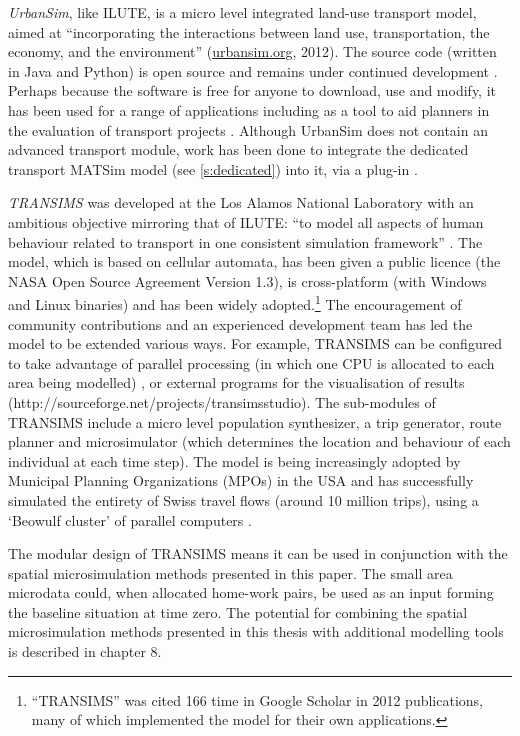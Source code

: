 \documentclass[a4paper, 11pt, twoside]{Thesis}
\begin{document}
\emph{UrbanSim}, like ILUTE, is a micro level integrated land-use transport
model, aimed at 
``incorporating the interactions between land use, transportation, the economy,
and the environment'' (\href{http://www.urbansim.org/Main/WebHome}{urbansim.org}, 2012).
The source code (written in Java and Python)
is open source and remains under continued development \citep{Nicolai2012-matsim}.
Perhaps because the software is free for anyone to download, use and modify,
it has been used for a range of applications including as a tool
to aid planners in the evaluation of transport projects \citep{Borning2008}.
Although UrbanSim does not contain an advanced transport module,
work has been done to integrate the dedicated transport MATSim model (see
\cref{s:dedicated}) into it,
via a plug-in \citep{Nicolai2012-matsim}.

\emph{TRANSIMS}  was developed at the Los Alamos National
Laboratory with an
ambitious objective mirroring that of ILUTE:
``to model all aspects of human behaviour related to
transport in one consistent simulation framework''
\citep[p.~1]{nagel1999transims}.  The model, which is based on cellular
automata, has been given a public licence (the NASA Open Source Agreement
Version 1.3), is cross-platform (with Windows and Linux binaries) and has been
widely adopted.\footnote{``TRANSIMS''
was cited 166 time in Google
Scholar in 2012 publications, many of which implemented the model for their own
applications.}
The encouragement of community contributions and an experienced development team
has led the model to be extended various ways. For example, TRANSIMS can be
configured to take advantage of parallel processing (in which one CPU is
allocated to each area being modelled) \citep{nagel2001parallel}, or external
programs for the visualisation of results
(http://sourceforge.net/projects/transimsstudio). The sub-modules of TRANSIMS
include a micro level population synthesizer, a trip generator, route planner
and microsimulator (which determines the location and behaviour of each
individual at each time step). The model is being increasingly adopted by
Municipal Planning Organizations (MPOs) in the USA \citep{lawe2009transims,
ullah2011travel} and has successfully simulated the entirety of Swiss travel
flows (around 10 million trips), using a `Beowulf cluster' of parallel computers
\citep{Raney2003}.

The modular design of TRANSIMS means it can be used in conjunction with the
spatial microsimulation methods presented in this paper. The small area
microdata could, when allocated home-work pairs, be used as an input forming
the baseline situation at time zero. The potential for combining the spatial
microsimulation methods presented in this thesis with additional modelling
tools is described in chapter 8.
\end{document}
